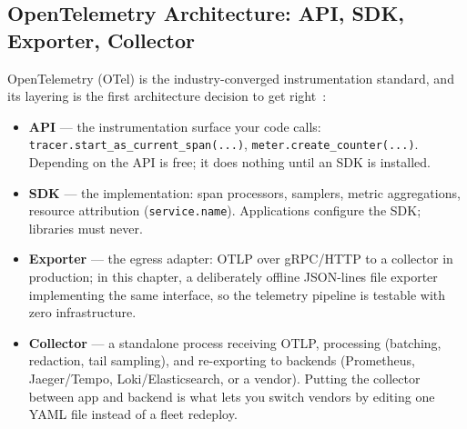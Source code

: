 \subsection{OpenTelemetry Architecture: API, SDK, Exporter, Collector}
\label{subsec:ch18-otel}

OpenTelemetry (OTel) is the industry-converged instrumentation standard,
and its layering is the first architecture decision to get
right~\cite{opentelemetrydocs}:

\begin{itemize}
  \item \textbf{API} --- the instrumentation surface your code calls:
        \texttt{tracer.start\_as\_current\_span(...)},
        \texttt{meter.create\_counter(...)}. Depending on the API is free;
        it does nothing until an SDK is installed.
  \item \textbf{SDK} --- the implementation: span processors, samplers,
        metric aggregations, resource attribution (\texttt{service.name}).
        Applications configure the SDK; libraries must never.
  \item \textbf{Exporter} --- the egress adapter: OTLP over gRPC/HTTP to a
        collector in production; in this chapter, a deliberately offline
        JSON-lines file exporter implementing the same interface, so the
        telemetry pipeline is testable with zero infrastructure.
  \item \textbf{Collector} --- a standalone process receiving OTLP,
        processing (batching, redaction, tail sampling), and re-exporting
        to backends (Prometheus, Jaeger/Tempo, Loki/Elasticsearch, or a
        vendor). Putting the collector between app and backend is what lets
        you switch vendors by editing one YAML file instead of a fleet
        redeploy.
\end{itemize}

